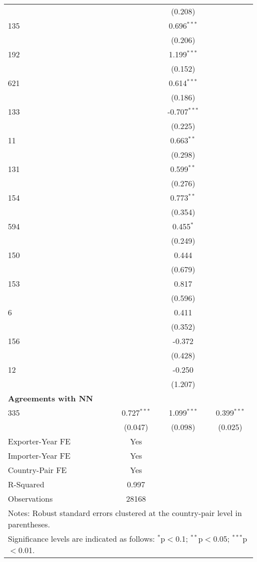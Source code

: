 \begin{table}[htbp]
\begin{adjustbox}{max width=\textwidth}
\begin{tabular}{lccc}
    &  & (0.208) &  \\
    135 &  & 0.696$^{\ast\ast\ast}$ &  \\
    &  & (0.206) &  \\
    192 &  & 1.199$^{\ast\ast\ast}$ &  \\
    &  & (0.152) &  \\
    621 &  & 0.614$^{\ast\ast\ast}$ &  \\
    &  & (0.186) &  \\
    133 &  & -0.707$^{\ast\ast\ast}$ &  \\
    &  & (0.225) &  \\
    11  &  & 0.663$^{\ast\ast}$ &  \\
    &  & (0.298) &  \\
    131  &  & 0.599$^{\ast\ast}$ &  \\
    &  & (0.276) &  \\
    154  &  & 0.773$^{\ast\ast}$ &  \\
    &  & (0.354) &  \\
    594  &  & 0.455$^{\ast}$ &  \\
    &  & (0.249) &  \\
    150 &  & 0.444 &  \\
    &  & (0.679) &  \\
    153 &  & 0.817 &  \\
    &  & (0.596) &  \\
    6   &  & 0.411 &  \\
    &  & (0.352) &  \\
    156   &  & -0.372 &  \\
    &  & (0.428) &  \\
    12   &  & -0.250 &  \\
    &  & (1.207) &  \\
    \hline
    \textbf{Agreements with NN} &  &  &  \\
    \hline
    335 & 0.727$^{\ast\ast\ast}$ & 1.099$^{\ast\ast\ast}$ & 0.399$^{\ast\ast\ast}$ \\
    & (0.047) & (0.098) & (0.025) \\
    \hline
    Exporter-Year FE & Yes \\
    Importer-Year FE & Yes \\
    Country-Pair FE & Yes \\
    R-Squared & 0.997 \\
    Observations & 28168 \\
    \hline
    \multicolumn{4}{l}{\footnotesize{Notes: Robust standard errors clustered at the country-pair level in parentheses.}} \\
    \multicolumn{4}{l}{\footnotesize{Significance levels are indicated as follows: $^{\ast}$p$<$0.1; $^{\ast\ast}$p$<$0.05; $^{\ast\ast\ast}$p$<$0.01.}} \\
    \end{tabular}
    \end{adjustbox}
\end{table}
